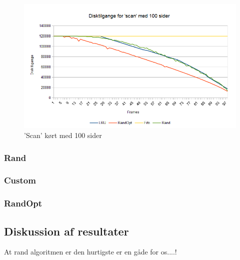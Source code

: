 \begin{figure}[ht]
\centerline{\includegraphics[scale=1]{graph/stat_scan}}
\FloatBarrier
\caption{'Scan' kørt med 100 sider}
\label{fig:scan}
\end{figure}

\subsubsection{Rand}

\subsubsection{Custom}

\subsubsection{RandOpt}

\subsection{Diskussion af resultater}
At rand algoritmen er den hurtigste er en gåde for os....!
